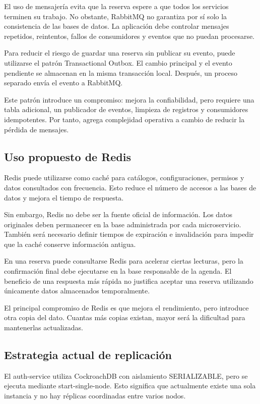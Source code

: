 \documentclass[conference]{IEEEtran}
\begin{document}
El uso de mensajería evita que la reserva espere a que todos los servicios terminen su trabajo. No obstante, RabbitMQ no garantiza por sí solo la consistencia de las bases de datos. La aplicación debe controlar mensajes repetidos, reintentos, fallos de consumidores y eventos que no puedan procesarse.

Para reducir el riesgo de guardar una reserva sin publicar su evento, puede utilizarse el patrón Transactional Outbox. El cambio principal y el evento pendiente se almacenan en la misma transacción local. Después, un proceso separado envía el evento a RabbitMQ.

Este patrón introduce un compromiso: mejora la confiabilidad, pero requiere una tabla adicional, un publicador de eventos, limpieza de registros y consumidores idempotentes. Por tanto, agrega complejidad operativa a cambio de reducir la pérdida de mensajes.

\subsection{Uso propuesto de Redis}
Redis puede utilizarse como caché para catálogos, configuraciones, permisos y datos consultados con frecuencia. Esto reduce el número de accesos a las bases de datos y mejora el tiempo de respuesta.

Sin embargo, Redis no debe ser la fuente oficial de información. Los datos originales deben permanecer en la base administrada por cada microservicio. También será necesario definir tiempos de expiración e invalidación para impedir que la caché conserve información antigua.

En una reserva puede consultarse Redis para acelerar ciertas lecturas, pero la confirmación final debe ejecutarse en la base responsable de la agenda. El beneficio de una respuesta más rápida no justifica aceptar una reserva utilizando únicamente datos almacenados temporalmente.

El principal compromiso de Redis es que mejora el rendimiento, pero introduce otra copia del dato. Cuantas más copias existan, mayor será la dificultad para mantenerlas actualizadas.

\subsection{Estrategia actual de replicación}
El auth-service utiliza CockroachDB con aislamiento SERIALIZABLE, pero se ejecuta mediante start-single-node. Esto significa que actualmente existe una sola instancia y no hay réplicas coordinadas entre varios nodos.
\end{document}
